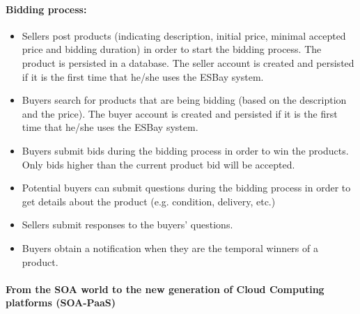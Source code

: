 \documentclass[12pt]{article}
\begin{document}
\paragraph{Bidding process:}
\begin{itemize}
  \item Sellers post products (indicating description, initial price, minimal accepted price and bidding duration) in
        order to start the bidding process. The product is persisted in a database. The seller account is created and
        persisted if it is the first time that he/she uses the ESBay system.
  \item Buyers search for products that are being bidding (based on the description and the price). The buyer
        account is created and persisted if it is the first time that he/she uses the ESBay system.
  \item Buyers submit bids during the bidding process in order to win the products. Only bids higher than the
        current product bid will be accepted.
  \item Potential buyers can submit questions during the bidding process in order to get details about the product
        (e.g. condition, delivery, etc.)
  \item Sellers submit responses to the buyers' questions.
  \item Buyers obtain a notification when they are the temporal winners of a product.
\end{itemize}

\paragraph{From the SOA world to the new generation of Cloud Computing platforms (SOA-PaaS)}
\end{document}

